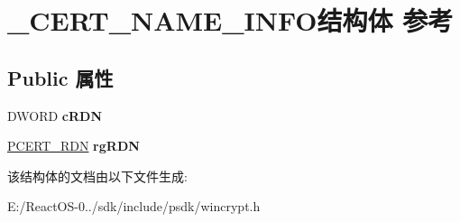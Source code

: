 \hypertarget{struct___c_e_r_t___n_a_m_e___i_n_f_o}{}\section{\+\_\+\+C\+E\+R\+T\+\_\+\+N\+A\+M\+E\+\_\+\+I\+N\+F\+O结构体 参考}
\label{struct___c_e_r_t___n_a_m_e___i_n_f_o}
\subsection*{Public 属性}
\begin{DoxyCompactItemize}
\item 
\mbox{\label{struct___c_e_r_t___n_a_m_e___i_n_f_o_a953213f56cd6d0a1ed22db2eb3decb28}} 
D\+W\+O\+RD {\bfseries c\+R\+DN}
\item 
\mbox{\label{struct___c_e_r_t___n_a_m_e___i_n_f_o_a6d0d7a7fe915ef74ec6979b4c369d7b7}} 
\hyperlink{struct___c_e_r_t___r_d_n}{P\+C\+E\+R\+T\+\_\+\+R\+DN} {\bfseries rg\+R\+DN}
\end{DoxyCompactItemize}


该结构体的文档由以下文件生成\+:\begin{DoxyCompactItemize}
\item 
E\+:/\+React\+O\+S-\/0../sdk/include/psdk/wincrypt.\+h\end{DoxyCompactItemize}

